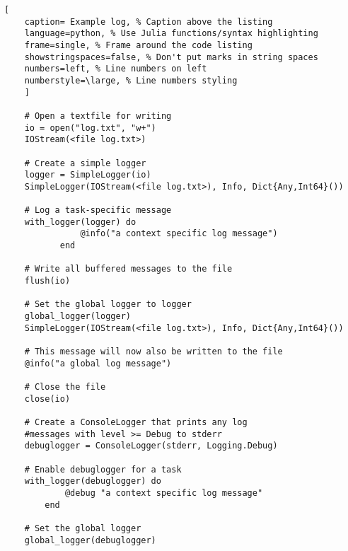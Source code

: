 \documentclass[11pt]{scrartcl} %
\begin{document}
\begin{lstlisting}[
	caption= Example log, % Caption above the listing
	language=python, % Use Julia functions/syntax highlighting
	frame=single, % Frame around the code listing
	showstringspaces=false, % Don't put marks in string spaces
	numbers=left, % Line numbers on left
	numberstyle=\large, % Line numbers styling
	]

	# Open a textfile for writing
	io = open("log.txt", "w+")
	IOStream(<file log.txt>)
	
	# Create a simple logger
	logger = SimpleLogger(io)
	SimpleLogger(IOStream(<file log.txt>), Info, Dict{Any,Int64}())
	
	# Log a task-specific message
	with_logger(logger) do
			   @info("a context specific log message")
		   end
	
	# Write all buffered messages to the file
	flush(io)
	
	# Set the global logger to logger
	global_logger(logger)
	SimpleLogger(IOStream(<file log.txt>), Info, Dict{Any,Int64}())
	
	# This message will now also be written to the file
	@info("a global log message")
	
	# Close the file
	close(io)

	# Create a ConsoleLogger that prints any log 
	#messages with level >= Debug to stderr
	debuglogger = ConsoleLogger(stderr, Logging.Debug)

	# Enable debuglogger for a task
	with_logger(debuglogger) do
			@debug "a context specific log message"
		end

	# Set the global logger
	global_logger(debuglogger)


\end{lstlisting}


\end{document}
